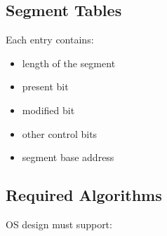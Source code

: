 \documentclass[]{article}
\theoremstyle{definition}
\begin{document}
	\subsection{Segment Tables}
	Each entry contains:
	\begin{itemize}
		\item length of the segment
		\item present bit
		\item modified bit
		\item other control bits
		\item segment base address
	\end{itemize}

	\subsection{Required Algorithms}
	OS design must support:
\end{document}
